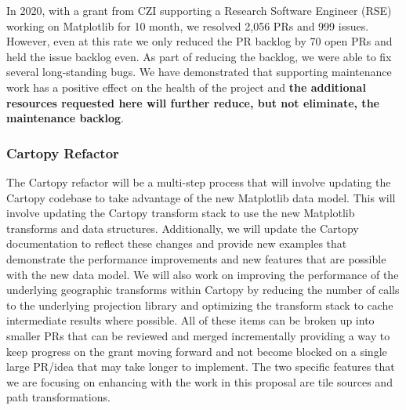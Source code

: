 \documentclass[12pt]{article}
\numberwithin{page}{section}
\begin{document}

In 2020, with a grant from CZI supporting a Research Software Engineer
(RSE) working on Matplotlib for 10 month, we resolved 2,056 PRs and
999 issues.  However, even at this rate we only reduced the PR backlog
by 70 open PRs and held the issue backlog even.  As part of reducing
the backlog, we were able to fix several long-standing bugs.  We have
demonstrated that supporting maintenance work has a positive effect on
the health of the project and \textbf{the additional resources
  requested here will further reduce, but not eliminate, the
  maintenance backlog}.



\subsubsection{Cartopy Refactor}

The Cartopy refactor will be a multi-step process that will involve updating the
Cartopy codebase to take advantage of the new Matplotlib data model. This will
involve updating the Cartopy transform stack to use the new Matplotlib transforms
and data structures. Additionally, we will update the Cartopy documentation to
reflect these changes and provide new examples that demonstrate the performance
improvements and new features that are possible with the new data model. We will
also work on improving the performance of the underlying geographic transforms within Cartopy
by reducing the number of calls to the underlying projection library and optimizing
the transform stack to cache intermediate results where possible. All of these items
can be broken up into smaller PRs that can be reviewed and merged incrementally providing
a way to keep progress on the grant moving forward and not become blocked on a single
large PR/idea that may take longer to implement. The two specific features that we are
focusing on enhancing with the work in this proposal are tile sources and path transformations.
\end{document}
